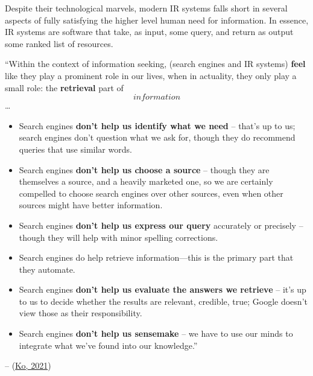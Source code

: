 \documentclass[a4paper, nobind]{templates/ociamthesis}
\begin{document}
Despite their technological marvels, modern IR systems falls short in
several aspects of fully satisfying the higher level human need for
information. In essence, IR systems are software that take, as input,
some query, and return as output some ranked list of resources.

``Within the context of information seeking, (search engines and IR
systems) \textbf{feel} like they play a prominent role in our lives, when in
actuality, they only play a small role: the \textbf{retrieval} part of
\[information\] \ldots{}

\begin{itemize}
\item
  Search engines \textbf{don't help us identify what we need} -- that's up
  to us; search engines don't question what we ask for, though they do
  recommend queries that use similar words.
\item
  Search engines \textbf{don't help us choose a source} -- though they are
  themselves a source, and a heavily marketed one, so we are certainly
  compelled to choose search engines over other sources, even when
  other sources might have better information.
\item
  Search engines \textbf{don't help us express our query} accurately or
  precisely -- though they will help with minor spelling corrections.
\item
  Search engines do help retrieve information---this is the primary
  part that they automate.
\item
  Search engines \textbf{don't help us evaluate the answers we retrieve} --
  it's up to us to decide whether the results are relevant, credible,
  true; Google doesn't view those as their responsibility.
\item
  Search engines \textbf{don't help us sensemake} -- we have to use our
  minds to integrate what we've found into our knowledge.''
\end{itemize}

-- (\protect\hyperlink{ref-ko2021seeking}{Ko, 2021})
\end{document}
